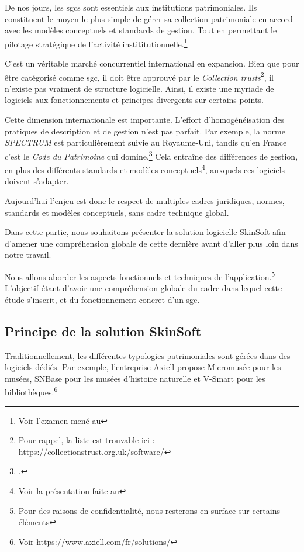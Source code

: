 
De nos jours, les \glspl{sgc} sont essentiels aux institutions patrimoniales. Ils constituent le moyen le plus simple de gérer sa collection patrimoniale en accord avec les modèles conceptuels et standards de gestion. Tout en permettant le pilotage stratégique de l'activité instititutionnelle.\footnote{Voir l'examen mené au }

C'est un véritable marché concurrentiel international en expansion. Bien que pour être catégorisé comme \gls{sgc}, il doit être approuvé par le \textit{Collection trusts}\footnote{Pour rappel, la liste est trouvable ici  : \url{https://collectionstrust.org.uk/software/}}, il n'existe pas vraiment de structure logicielle. Ainsi, il existe une myriade de logiciels aux fonctionnements et principes divergents sur certains points.

Cette dimension internationale est importante. L'effort d'homogénéisation des pratiques de description et de gestion n'est pas parfait. Par exemple, la norme \textit{SPECTRUM} est particulièrement suivie au Royaume-Uni, tandis qu'en France c'est le \textit{Code du Patrimoine} qui domine.\footcite{CodePatrimoineLegifrance} Cela entraîne des différences de gestion, en plus des différents standards et modèles conceptuels\footnote{Voir la présentation faite au }, auxquels ces logiciels doivent s'adapter.

Aujourd'hui l'enjeu est donc le respect de multiples cadres juridiques, normes, standards et modèles conceptuels, sans cadre technique global.\newline

Dans cette partie, nous souhaitons présenter la solution logicielle SkinSoft afin d'amener une compréhension globale de cette dernière avant d'aller plus loin dans notre travail.

Nous allons aborder les aspects fonctionnels et techniques de l'application.\footnote{Pour des raisons de confidentialité, nous resterons en surface sur certains éléments} L'objectif étant d'avoir une compréhension globale du cadre dans lequel cette étude s'inscrit, et du fonctionnement concret d'un \gls{sgc}.

\subsection{Principe de la solution SkinSoft}

Traditionnellement, les différentes typologies patrimoniales sont gérées dans des logiciels dédiés. Par exemple, l'entreprise Axiell propose Micromusée pour les musées, SNBase pour les musées d'histoire naturelle et V-Smart pour les bibliothèques.\footnote{Voir \url{https://www.axiell.com/fr/solutions/}}

